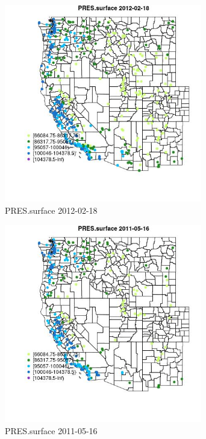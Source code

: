 \begin{figure} 
\centering  
\includegraphics[width=0.77\textwidth]{Code_Outputs/Report_ML_input_PM25_Step4_part_f_de_duplicated_aves_prioritize_24hr_obswNAs_MapObsPRESsurface2012-02-18.jpg} 
\caption{\label{fig:Report_ML_input_PM25_Step4_part_f_de_duplicated_aves_prioritize_24hr_obswNAsMapObsPRESsurface2012-02-18}PRES.surface 2012-02-18} 
\end{figure} 
 

\begin{figure} 
\centering  
\includegraphics[width=0.77\textwidth]{Code_Outputs/Report_ML_input_PM25_Step4_part_f_de_duplicated_aves_prioritize_24hr_obswNAs_MapObsPRESsurface2011-05-16.jpg} 
\caption{\label{fig:Report_ML_input_PM25_Step4_part_f_de_duplicated_aves_prioritize_24hr_obswNAsMapObsPRESsurface2011-05-16}PRES.surface 2011-05-16} 
\end{figure} 
 

